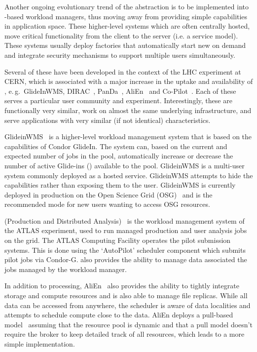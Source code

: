 \documentclass{sig-alternate}
\begin{document}
Another ongoing evolutionary trend of the \pilot abstraction is to be
implemented into \pilot-based workload managers, thus moving away from providing
simple \pilot capabilities in application space. These higher-level systems
which are often centrally hosted, move critical functionality from the client to
the server (i.e. a service model). These systems usually deploy \pilot factories
that automatically start new \pilots on demand and integrate security mechanisms
to support multiple users simultaneously.

Several of these have been developed in the context of the LHC experiment at
CERN, which is associated with a major increase in the uptake and availability
of \pilots, e.\,g.\ GlideInWMS, DIRAC~\cite{1742-6596-219-6-062049},
PanDa~\cite{1742-6596-331-7-072069}, AliEn~\cite{1742-6596-119-6-062012} and
Co-Pilot~\cite{copilot-tr}. Each of these \pilots serves a particular user
community and experiment. Interestingly, these \pilots are functionally very
similar, work on almost the same underlying infrastructure, and serve
applications with very similar (if not identical) characteristics.

GlideinWMS~\cite{1742-6596-119-6-062044} is a higher-level workload management
system that is based on the \pilot capabilities of Condor GlideIn. The system
can, based on the current and expected number of jobs in the pool, automatically
increase or decrease the number of active Glide-ins (\pilots) available to the
pool. GlideinWMS is a multi-user \pilotjob system commonly deployed as a hosted
service. GlideinWMS attempts to hide the \pilot capabilities rather than
exposing them to the user. GlideinWMS is currently deployed in production on the
Open Science Grid (OSG)~\cite{url_osg} and is the recommended mode for new users
wanting to access OSG resources.

\panda (Production and Distributed Analysis)~\cite{1742-6596-331-7-072069} is
the workload management system of the ATLAS experiment, used to run managed
production and user analysis jobs on the grid. The ATLAS Computing Facility
operates the pilot submission systems. This is done using the \panda `AutoPilot'
scheduler component which submits pilot jobs via Condor-G. \panda also provides
the ability to manage data associated the jobs managed by the \panda workload
manager.

In addition to processing, AliEn~\cite{1742-6596-119-6-062012} also provides the
ability to tightly integrate storage and compute resources and is also able to
manage file replicas. While all data can be accessed from anywhere, the
scheduler is aware of data localities and attempts to schedule compute close to
the data. AliEn deploys a pull-based model~\cite{Saiz:2003:alien} assuming that
the resource pool is dynamic and that a pull model doesn't require the broker to
keep detailed track of all resources, which leads to a more simple
implementation.
\end{document}
